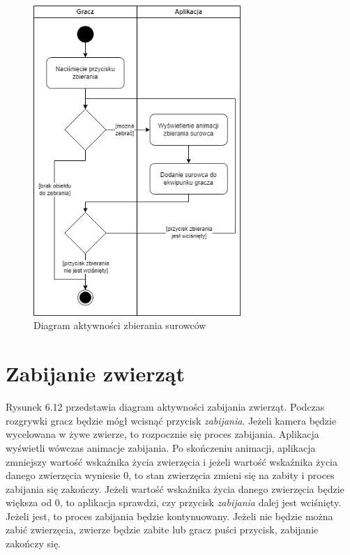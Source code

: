 \begin{figure}[H]
    \centering
        \includegraphics[width=0.7\textwidth]{Graphics/activities/gathering_materials.png}
         \caption{Diagram aktywności zbierania surowców}
\end{figure}

\clearpage

\section{Zabijanie zwierząt}

Rysunek 6.12 przedstawia diagram aktywności zabijania zwierząt.
Podczas rozgrywki gracz będzie mógł wcisnąć przycisk \textit{zabijania}. Jeżeli kamera będzie wycelowana w żywe zwierze, to rozpocznie się proces zabijania. Aplikacja wyświetli wówczas animacje zabijania. Po skończeniu animacji, aplikacja zmniejszy wartość wskaźnika życia zwierzęcia i jeżeli wartość wskaźnika życia danego zwierzęcia wyniesie 0, to stan zwierzęcia zmieni się na zabity i proces zabijania się zakończy. Jeżeli wartość wskaźnika życia danego zwierzęcia będzie większa od 0, to aplikacja sprawdzi, czy przycisk \textit{zabijania} dalej jest wciśnięty. Jeżeli jest, to proces zabijania będzie kontynuowany. Jeżeli nie będzie można zabić zwierzęcia, zwierze będzie zabite lub gracz puści przycisk, zabijanie zakończy się.

